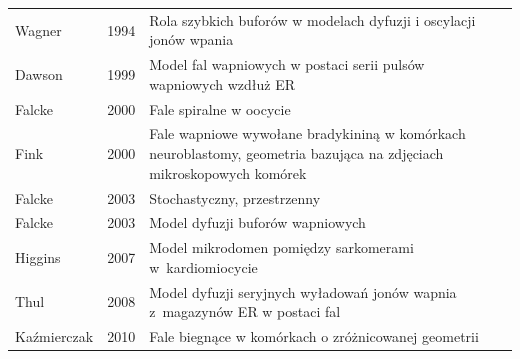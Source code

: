 \begin{small}
\begin{longtable}{llP{9cm}r}
Wagner        & 1994 & Rola szybkich buforów w modelach dyfuzji i oscylacji jonów wpania& \cite{Wagner1994} \\
Dawson        & 1999 & Model fal wapniowych w postaci serii pulsów wapniowych wzdłuż ER & \cite{Dawson1999}\\
Falcke        & 2000 & Fale spiralne w oocycie & \cite{Falcke2000} \\
Fink          & 2000 & Fale wapniowe wywołane bradykininą w komórkach neuroblastomy, geometria bazująca na zdjęciach mikroskopowych komórek & \cite{Fink2000} \\
Falcke        & 2003 & Stochastyczny, przestrzenny & \cite{Falcke2003} \\
Falcke        & 2003 & Model dyfuzji buforów wapniowych & \cite{Falcke2003a}\\
Higgins       & 2007 & Model mikrodomen pomiędzy sarkomerami w~kardiomiocycie & \cite{Higgins2007}\\
Thul          & 2008 & Model dyfuzji seryjnych wyładowań jonów wapnia z~magazynów ER w postaci fal & \cite{Thul2008a}\\
Kaźmierczak   & 2010 & Fale biegnące w komórkach o zróżnicowanej geometrii & \cite{Kazmierczak2010} \\
 \bottomrule[0.12em]
\end{longtable}
\end{small}